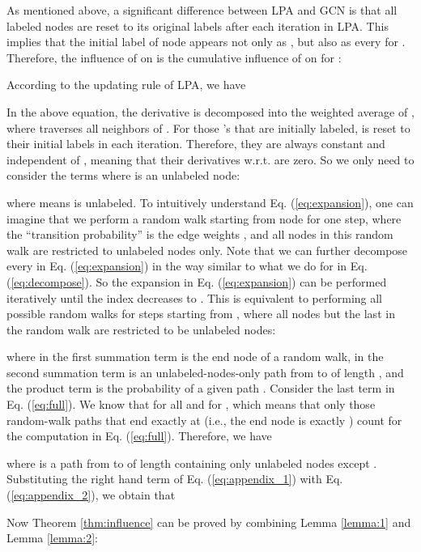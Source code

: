 \documentclass{article}
\newenvironment{proof}{{\noindent\it Proof.}\quad}{\hfill \par}
\begin{document}
		\begin{proof}
			As mentioned above, a significant difference between LPA and GCN is that all labeled nodes are reset to its original labels after each iteration in LPA.
			This implies that the initial label  of node  appears not only as , but also as every  for .
			Therefore, the influence of  on  is the cumulative influence of  on  for :
			
			According to the updating rule of LPA, we have
			
			In the above equation, the derivative  is decomposed into the weighted average of , where  traverses all neighbors of .
			For those 's that are initially labeled,  is reset to their initial labels in each iteration.
			Therefore, they are always constant and independent of , meaning that their derivatives w.r.t.  are zero.
			So we only need to consider the terms where  is an unlabeled node:
			
			where  means  is unlabeled.
			To intuitively understand Eq. (\ref{eq:expansion}), one can imagine that we perform a random walk starting from node  for one step, where the ``transition probability'' is the edge weights , and all nodes in this random walk are restricted to unlabeled nodes only.
			Note that we can further decompose every  in Eq. (\ref{eq:expansion}) in the way similar to what we do for  in Eq. (\ref{eq:decompose}).
			So the expansion in Eq. (\ref{eq:expansion}) can be performed iteratively until the index  decreases to .
			This is equivalent to performing all possible random walks for  steps starting from , where all nodes but the last in the random walk are restricted to be unlabeled nodes:
			
			where  in the first summation term is the end node of a random walk,  in the second summation term is an unlabeled-nodes-only path from  to  of length , and the product term is the probability of a given path .
			Consider the last term  in Eq. (\ref{eq:full}).
			We know that  for all  and  for , which means that only those random-walk paths that end exactly at  (i.e., the end node  is exactly ) count for the computation in Eq. (\ref{eq:full}).
			Therefore, we have
			
			where  is a path from  to  of length  containing only unlabeled nodes except .
			Substituting the right hand term of Eq. (\ref{eq:appendix_1}) with Eq. (\ref{eq:appendix_2}), we obtain that
			
		\end{proof}
		
		Now Theorem \ref{thm:influence} can be proved by combining Lemma \ref{lemma:1} and Lemma \ref{lemma:2}:
		
\end{document}
